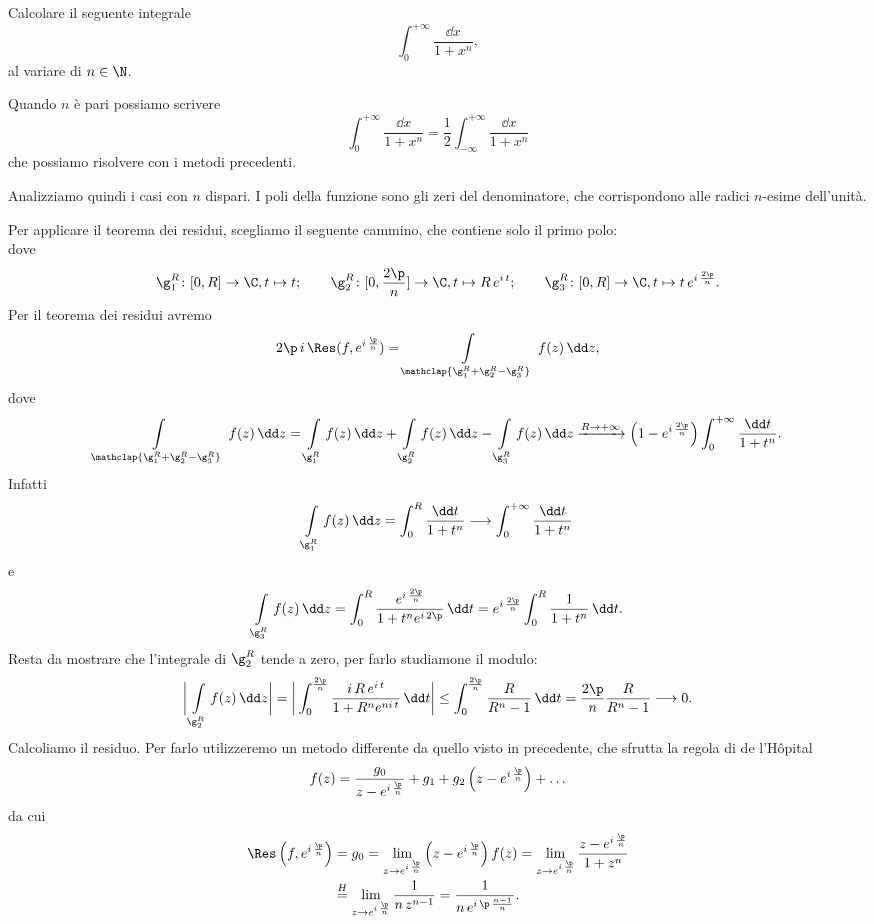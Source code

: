 \begin{exeN}
	Calcolare il seguente integrale
	\[
		\int_0^{+\infty} \frac{\dd x}{1+x^n},
	\]
	al variare di \(n\in\N\).
\end{exeN}

\begin{sol}
	Quando \(n\) è pari possiamo scrivere
	\[
		\int_0^{+\infty} \frac{\dd x}{1+x^n} = \frac{1}{2} \int_{-\infty}^{+\infty} \frac{\dd x}{1+x^n}
	\]
	che possiamo risolvere con i metodi precedenti.

	Analizziamo quindi i casi con \(n\) dispari. I poli della funzione sono gli zeri del denominatore, che corrispondono alle radici \(n\)-esime dell'unità.

	Per applicare il teorema dei residui, scegliamo il seguente cammino, che contiene solo il primo polo:
	\[
		
	\]
	dove
	\[
		\g_1^R\colon [0,R] \to \C, t\mapsto t; \qquad \g_2^R\colon [0,\frac{2\p}{n}] \to \C, t\mapsto R\,e^{i\,t}; \qquad \g_3^R\colon [0,R] \to \C, t \mapsto t\,e^{i\,\frac{2\p}{n}}.
	\]
	Per il teorema dei residui avremo
	\[
		2\p\,i\,\Res(f,e^{i\,\frac{\p}{n}}) = \int\limits_{\mathclap{\g_1^R+\g_2^R-\g_3^R}}\, f(z)\,\dd z,
	\]
	dove
	\[
		\int\limits_{\mathclap{\g_1^R+\g_2^R-\g_3^R}}\, f(z)\,\dd z = \int\limits_{\g_1^R}f(z)\,\dd z + \int\limits_{\g_2^R}f(z)\,\dd z - \int\limits_{\g_3^R}f(z)\,\dd z \xrightarrow{R\to+\infty} \left( 1-e^{i\,\frac{2\p}{n}} \right) \int_0^{+\infty} \frac{\dd t}{1+t^n}.
	\]
	Infatti
	\[
		\int\limits_{\g_1^R} f(z)\,\dd z = \int_0^R \frac{\dd t}{1+t^n} \longrightarrow \int_0^{+\infty} \frac{\dd t}{1+t^n}
	\]
	e
	\[
		\int\limits_{\g_3^R} f(z)\,\dd z = \int_0^R \frac{e^{i\,\frac{2\p}{n}}}{1+t^n e^{i\,2\p}}\,\dd t = e^{i\,\frac{2\p}{n}} \int_0^R \frac{1}{1+t^n}\,\dd t.
	\]
	Resta da mostrare che l'integrale di \(\g_2^R\) tende a zero, per farlo studiamone il modulo:
	\[
		\bigg\lvert \int\limits_{\g_2^R} f(z)\,\dd z \bigg\rvert = \bigg\lvert \int_0^{\frac{2\p}{n}} \frac{i\,R\,e^{i\,t}}{1+R^n e^{ni\,t}}\,\dd t \bigg\rvert \le \int_0^{\frac{2\p}{n}} \frac{R}{R^n-1}\,\dd t = \frac{2\p}{n} \frac{R}{R^n-1} \longrightarrow 0.
	\]
	Calcoliamo il residuo. Per farlo utilizzeremo un metodo differente da quello visto in precedente, che sfrutta la regola di de l'H\^opital
	\[
		f(z) = \frac{g_0}{z-e^{i\,\frac{\p}{n}}} + g_1 + g_2 \left( z-e^{i\,\frac{\p}{n}} \right) + \ldots
	\]
	da cui
	\[
		\begin{split}
			\Res \left( f, e^{i\,\frac{\p}{n}} \right) & = g_0 = \lim_{z \to e^{i\,\frac{\p}{n}}} \left( z-e^{i\,\frac{\p}{n}} \right) f(z) = \lim_{z \to e^{i\,\frac{\p}{n}}} \frac{z-e^{i\,\frac{\p}{n}}}{1+z^n}\\
			& \overset{H}{=} \lim_{z \to e^{i\,\frac{\p}{n}}} \frac{1}{n\,z^{n-1}} = \frac{1}{n\,e^{i\,\p\,\frac{n-1}{n}}}.
		\end{split}
	\]
\end{sol}
